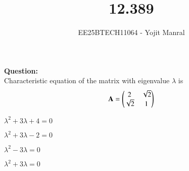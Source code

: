 \documentclass[journal]{IEEEtran}
\begin{document}

\vspace{3cm}

\title{12.389}
\author{EE25BTECH11064 - Yojit Manral}

\maketitle
{\let\newpage\relax\maketitle}
\renewcommand{\thefigure}{\theenumi}
\renewcommand{\thetable}{\theenumi}
\setlength{\intextsep}{10pt} %

\textbf{Question:}\\
Characteristic equation of the matrix with eigenvalue $\lambda$ is
\begin{align}
    \mathbf{A} = \begin{pmatrix}2&\sqrt{2}\\ \sqrt{2}&1\end{pmatrix}
\end{align}
\begin{enumerate}[label=(\alph*)]
\begin{multicols}{4}
    \item $\lambda^2+3\lambda+4=0$
    \item $\lambda^2+3\lambda-2=0$
    \item $\lambda^2-3\lambda=0$
    \item $\lambda^2+3\lambda=0$
\end{multicols}
\end{enumerate}
\end{document}
